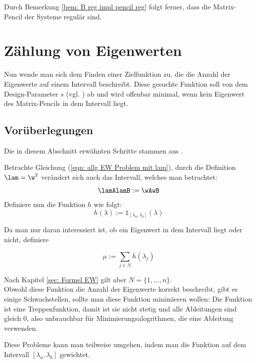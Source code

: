 \documentclass[a4paper,12pt]{report}
\newcommand{\1}{\mathds{1}}
\theoremstyle{plain} %
\theoremstyle{definition} %
\theoremstyle{remark}
\begin{document}
            Durch Bemerkung \ref{bem: B reg impl pencil reg} folgt ferner, dass die Matrix-Pencil der Systeme regulär sind.

\chapter{Zählung von Eigenwerten}
\label{sec: EW Zählung}
      Nun wende man sich dem Finden einer Zielfunktion zu, die die Anzahl der Eigenwerte auf einem Intervall beschreibt.
      Diese gesuchte Funktion soll von dem Design-Parameter $s$ (vgl. \cite[S. 2]{hauptteilTkachuk}) ab und wird offenbar minimal, wenn kein Eigenwert des Matrix-Pencils in dem Intervall liegt.

      \section{Vorüberlegungen}
            Die in diesem Abschnitt erwähnten Schritte stammen aus \cite[S. 2-4]{hauptteilTkachuk}.

            Betrachte Gleichung (\ref{eqn: allg EW Problem mit lam}), durch die Definition $\lam = \w^2$ verändert sich auch das Intervall, welches man betrachtet:
            $$\lamAlamB:=\wAwB$$
            Definiere nun die Funktion $h$ wie folgt:
            $$h(\lambda):=\1_{[\lambda_a,\lambda_b]}(\lambda)$$

            Da man nur daran interessiert ist, ob ein Eigenwert in dem Intervall liegt oder nicht, definiere

            $$\mu := \sum_{j\in N} h(\lambda_j)$$

            Nach Kapitel \ref{sec: Formel EW} gilt aber $N=\{1,\dots,n\}$.\\
            Obwohl diese Funktion die Anzahl der Eigenwerte korrekt beschreibt, gibt es einige Schwachstellen, sollte man diese Funktion minimieren wollen:
            Die Funktion ist eine Treppenfunktion, damit ist sie nicht stetig und alle Ableitungen sind gleich 0, also unbrauchbar für Minimierungsalogrithmen, die eine Ableitung verwenden.

            Diese Probleme kann man teilweise umgehen, indem man die Funktion auf dem Intervall $[\lambda_a, \lambda_b]$ gewichtet.
\end{document}
